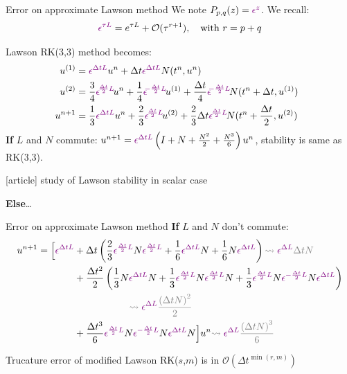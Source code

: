 \documentclass{beamer}
\newcommand{\mbold}[1]{{\textbf{\color{PLB}#1}}}
\newcommand{\customcite}[1]{\cite{#1}}
\begin{document}
\newcommand{\pexp}[1]{\textcolor{violet}{ \epsilon^{#1} }}
\begin{frame}{Error on approximate Lawson method}
  We note $P_{p,q}(z) = \pexp{z}$.
  We recall: $$\pexp{\tau L} = e^{\tau L} + \mathcal{O}(\tau^{r+1}),\quad\text{with}\ r=p+q$$

  Lawson RK(3,3) method becomes:
  $$
    \begin{aligned}
      \!\!\!\!u^{(1)} &= \pexp{\Delta t L}u^n + \Delta t\pexp{\Delta t L}N(t^n,u^n) \\
      \!\!\!\!u^{(2)} &= \frac{3}{4}\pexp{\!\frac{\Delta t}{2} L\!}u^n + \frac{1}{4}\pexp{\!\!-\frac{\Delta t}{2} L\!}u^{(1)} + \frac{\Delta t}{4}\pexp{\!\!-\frac{\Delta t}{2} L\!} N(t^n+\Delta t,u^{(1)}) \\
      \!\!\!\!u^{n+1} &= \frac{1}{3}\pexp{\Delta t L}u^n + \frac{2}{3}\pexp{\!\frac{\Delta t}{2} L\!}u^{(2)} + \frac{2}{3}\Delta t \pexp{\!\frac{\Delta t}{2} L\!} N(t^n+\frac{\Delta t}{2},u^{(2)})
    \end{aligned}
  $$
  \mbold{If} $L$ and $N$ commute: $u^{n+1} = \pexp{\Delta tL}\left(I + N + \frac{N^2}{2} + \frac{N^3}{6} \right)u^n$, stability is same as RK(3,3).
  \begin{thebibliography}{9}
    [article]
     \customcite{Crouseilles:2019b} \textcolor{defaultcolor}{study of Lawson stability in scalar case}
  \end{thebibliography}
   \mbold{Else}\dots

\end{frame}
\begin{frame}{Error on approximate Lawson method}
  \mbold{If} $L$ and $N$ don't commute:
  $$
    \begin{aligned}
      u^{n+1} = \Big[ \pexp{\Delta tL}
        &+\Delta t\left(\frac{2}{3}\pexp{\frac{\Delta t}{2}L}N\pexp{\frac{\Delta t}{2}L}+\frac{1}{6}\pexp{\Delta tL}N + \frac{1}{6}N\pexp{\Delta tL}\right)
          \textcolor{gris}{\rightsquigarrow \pexp{\Delta L}\Delta t N} \\
        & + \frac{\Delta t^2}{2}\left(\frac{1}{3}N\pexp{\Delta tL}N + \frac{1}{3}\pexp{\frac{\Delta t}{2}L}N\pexp{\frac{\Delta t}{2}L}N + \frac{1}{3} \pexp{\frac{\Delta t}{2}L}N\pexp{-\frac{\Delta t}{2}L}N\pexp{\Delta tL} \right) \\
          &\hspace{2cm} \textcolor{gris}{\rightsquigarrow \pexp{\Delta L}\frac{\left(\Delta t N\right)^2}{2}} \\
      & + \frac{\Delta t^3}{6}\pexp{\frac{\Delta t}{2}L}N\pexp{-\frac{\Delta t}{2}L}N\pexp{\Delta tL}N \Big]u^n \textcolor{gris}{\rightsquigarrow \pexp{\Delta L}\frac{\left(\Delta t N\right)^3}{6}}
    \end{aligned}
  $$

  \begin{lemma}
    Trucature error of modified Lawson RK($s$,$m$) is in $\mathcal{O}(\Delta t^{\min(r,m)})$
  \end{lemma}
\end{frame}
\end{document}
